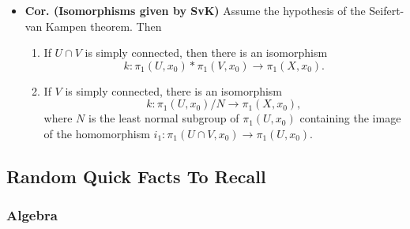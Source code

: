\documentclass{article}
\begin{document}
\begin{itemize}
		Let $j: \pi_1(U,x_0) \ast \pi_1(V,x_0) \to \pi_1(X,x_0)$ be the homomorphism of the free product that extends the homomorphisms $j_1$ and $j_2$ induced by inclusion. Then $j$ is surjective, and its kernel is  generated by all elements of the free product of the form $i_1(g)^-1i_2(g)$ and their conjugates. 
		
		\item \textbf{Cor. (Isomorphisms given by SvK)} Assume the hypothesis of the Seifert-van Kampen theorem. Then \vspace{-0.25cm}
		\begin{enumerate}[itemsep =-2pt,label = (\roman{*})]
			\item If $U \cap V$ is simply connected, then there is an isomorphism 
			\begin{equation*}
				k: \pi_1(U,x_0) \ast \pi_1(V,x_0) \to \pi_1(X,x_0). 
			\end{equation*}
			\item If $V$ is simply connected, there is an isomorphism 
			\begin{equation*}
				k: \pi_1(U,x_0)/N \to \pi_1(X,x_0), 
			\end{equation*}
			where $N$ is the least normal subgroup of $\pi_1(U,x_0)$ containing the image of the homomorphism $i_1:\pi_1(U \cap V,x_0) \to \pi_1(U,x_0)$. 
		\end{enumerate}
	\end{itemize}
	
	\newpage 
	\subsection{Random Quick Facts To Recall}
	\subsubsection{Algebra}
	
\end{document}
